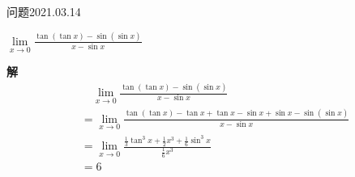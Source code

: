 \begin{mybox}{问题2021.03.14}
	
	\qquad $\lim\limits_{x \to 0} \frac{\tan(\tan x)-\sin(\sin x)}{x-\sin x}$
\end{mybox}
\noindent
\textbf{解}
\begin{align*}
	&\quad\lim\limits_{x \to 0} \frac{\tan(\tan x)-\sin(\sin x)}{x-\sin x}\\&= \lim \limits_{x \to 0} \frac{\tan(\tan x) -\tan x +\tan x -\sin x + \sin x -\sin(\sin x)}{x-\sin x}\\
	&=\lim \limits_{x\to 0}\frac{\frac{1}{3}\tan^3 x +\frac{1}{2}x^3 +\frac{1}{6}\sin^3 x}{\frac{1}{6}x^3}\\
	&=6
\end{align*}